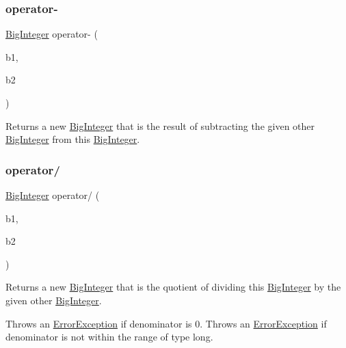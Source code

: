 \subsubsection{\texorpdfstring{operator-\/}{operator-}}
{\footnotesize\ttfamily \mbox{\hyperlink{classBigInteger}{Big\+Integer}} operator-\/ (\begin{DoxyParamCaption}\item[{const \mbox{\hyperlink{classBigInteger}{Big\+Integer}} \&}]{b1,  }\item[{const \mbox{\hyperlink{classBigInteger}{Big\+Integer}} \&}]{b2 }\end{DoxyParamCaption})\hspace{0.3cm}{\ttfamily [friend]}}



Returns a new \mbox{\hyperlink{classBigInteger}{Big\+Integer}} that is the result of subtracting the given other \mbox{\hyperlink{classBigInteger}{Big\+Integer}} from this \mbox{\hyperlink{classBigInteger}{Big\+Integer}}. 

\mbox{\label{classBigInteger_aa472efac72a9e7c868073119accefe94}} 
\subsubsection{\texorpdfstring{operator/}{operator/}}
{\footnotesize\ttfamily \mbox{\hyperlink{classBigInteger}{Big\+Integer}} operator/ (\begin{DoxyParamCaption}\item[{const \mbox{\hyperlink{classBigInteger}{Big\+Integer}} \&}]{b1,  }\item[{const \mbox{\hyperlink{classBigInteger}{Big\+Integer}} \&}]{b2 }\end{DoxyParamCaption})\hspace{0.3cm}{\ttfamily [friend]}}



Returns a new \mbox{\hyperlink{classBigInteger}{Big\+Integer}} that is the quotient of dividing this \mbox{\hyperlink{classBigInteger}{Big\+Integer}} by the given other \mbox{\hyperlink{classBigInteger}{Big\+Integer}}. 

Throws an \mbox{\hyperlink{classErrorException}{Error\+Exception}} if denominator is 0. Throws an \mbox{\hyperlink{classErrorException}{Error\+Exception}} if denominator is not within the range of type long. \mbox{\label{classBigInteger_a4dcc8676ab598fab3e5437c55b8dfaf5}} 
